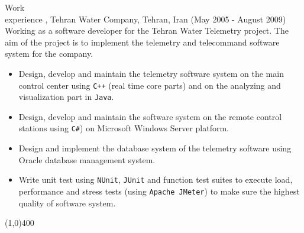 \documentclass{resume}
\begin{document}
\begin{category}{Work \\experience}
, Tehran Water Company, Tehran, Iran (May 2005 - August 2009)\\
Working as a software developer for the Tehran Water Telemetry project. The aim of the 
project is to implement the telemetry and telecommand software system for the company.
\begin{itemize}
 \item Design, develop and maintain the telemetry software system on the main control center using 
       \texttt{C++} (real time core parts) and on the analyzing and visualization part in \texttt{Java}.
 \item Design, develop and maintain the software system on the remote control stations using \texttt{C\#})
       on Microsoft Windows Server platform.
 \item Design and implement the database system of the telemetry software 
       using Oracle database management system.
 \item Write unit test using \texttt{NUnit}, \texttt{JUnit} and function test 
       suites to execute load, performance and stress tests (using \texttt{Apache JMeter}) 
       to make sure the highest quality of software system. 
\end{itemize}

\end{category}

\begin{center}
\line(1,0){400}
\end{center}


\end{document}
